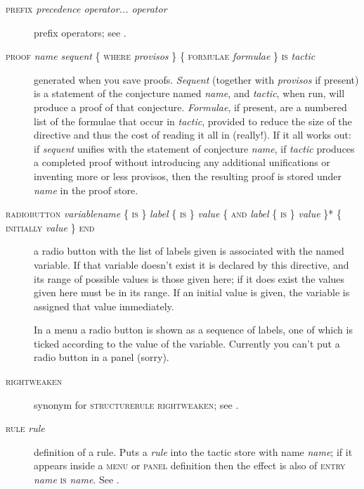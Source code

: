 \begin{description}
\item[\textsc{prefix} \textit{precedence operator... operator}] prefix operators; see .

\item[\textsc{proof} \textit{name sequent} \{ \textsc{where} \textit{provisos} \} \{ \textsc{formulae} \textit{formulae} \} \textsc{is} \textit{tactic}] generated when you save proofs. \textit{Sequent} (together with \textit{provisos} if present) is a statement of the conjecture named \textit{name}, and \textit{tactic}, when run, will produce a proof of that conjecture. \textit{Formulae}, if present, are a numbered list of the formulae that occur in \textit{tactic}, provided to reduce the size of the directive and thus the cost of reading it all in (really!). If it all works out: if \textit{sequent} unifies with the statement of conjecture \textit{name}, if \textit{tactic} produces a completed proof without introducing any additional unifications or inventing more or less provisos, then the resulting proof is stored under \textit{name} in the proof store.

\item[\textsc{radiobutton} \textit{variablename} \{ \textsc{is} \} \textit{label} \{ \textsc{is} \} \textit{value} \{ \textsc{and} \textit{label} \{ \textsc{is} \} \textit{value} \}* \{ \textsc{initially} \textit{value} \} \textsc{end}] a radio button with the list of labels given is associated with the named variable. If that variable doesn't exist it is declared by this directive, and its range of possible values is those given here; if it does exist the values given here must be in its range. If an initial value is given, the variable is assigned that value immediately.

In a menu a radio button is shown as a sequence of labels, one of which is ticked according to the value of the variable. Currently you can't put a radio button in a panel (sorry).%

\item[\textsc{rightweaken}] synonym for \textsc{structurerule} \textsc{rightweaken}; see .

\item[\textsc{rule} \textit{rule}] definition of a rule. Puts a \textit{rule} into the tactic store with name \textit{name}; if it appears inside a \textsc{menu} or \textsc{panel} definition then the effect is also of \textsc{entry} \textit{name} \textsc{is} \textit{name}. See .


\end{description}
